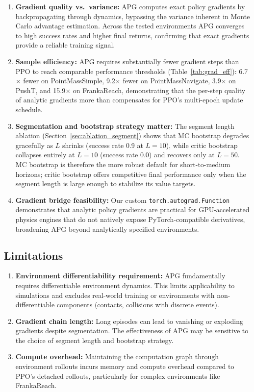 \documentclass[11pt,a4paper]{article}
\begin{document}
\begin{enumerate}
  \item \textbf{Gradient quality vs.\ variance:} APG computes exact policy gradients by backpropagating through dynamics, bypassing the variance inherent in Monte Carlo advantage estimation. Across the tested environments APG converges to high success rates and higher final returns, confirming that exact gradients provide a reliable training signal.

  \item \textbf{Sample efficiency:} APG requires substantially fewer gradient steps than PPO to reach comparable performance thresholds (Table~\ref{tab:grad_eff}): 6.7$\times$ fewer on PointMassSimple, 9.2$\times$ fewer on PointMassNavigate, 3.9$\times$ on PushT, and 15.9$\times$ on FrankaReach, demonstrating that the per-step quality of analytic gradients more than compensates for PPO's multi-epoch update schedule.

  \item \textbf{Segmentation and bootstrap strategy matter:} The segment length ablation (Section~\ref{sec:ablation_segment}) shows that MC bootstrap degrades gracefully as $L$ shrinks (success rate 0.9 at $L=10$), while critic bootstrap collapses entirely at $L=10$ (success rate 0.0) and recovers only at $L=50$. MC bootstrap is therefore the more robust default for short-to-medium horizons; critic bootstrap offers competitive final performance only when the segment length is large enough to stabilize its value targets.

  \item \textbf{Gradient bridge feasibility:} Our custom \texttt{torch.autograd.Function} demonstrates that analytic policy gradients are practical for GPU-accelerated physics engines that do not natively expose PyTorch-compatible derivatives, broadening APG beyond analytically specified environments.
\end{enumerate}

\subsection{Limitations}
\label{sec:limitations}

\begin{enumerate}
  \item \textbf{Environment differentiability requirement:} APG fundamentally requires differentiable environment dynamics. This limits applicability to simulations and excludes real-world training or environments with non-differentiable components (contacts, collisions with discrete events).

  \item \textbf{Gradient chain length:} Long episodes can lead to vanishing or exploding gradients despite segmentation. The effectiveness of APG may be sensitive to the choice of segment length and bootstrap strategy.

  \item \textbf{Compute overhead:} Maintaining the computation graph through environment rollouts incurs memory and compute overhead compared to PPO's detached rollouts, particularly for complex environments like FrankaReach.
\end{enumerate}
\end{document}
